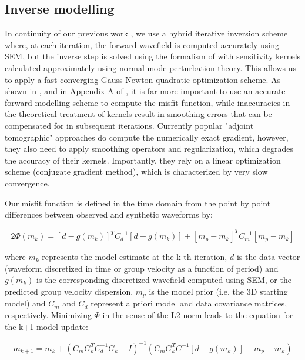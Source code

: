 \documentclass[12pt]{article}
\begin{document}
\subsection{Inverse modelling}

In continuity of our previous work \citep[e.g][]{marone2007three,yuan20113,yuan2014multiscale}, we use a hybrid iterative inversion scheme where, at each iteration, the forward wavefield is computed accurately using SEM, but the inverse step is solved using the formalism of \cite{tarantola1982generalized}  with sensitivity kernels calculated approximately using normal mode perturbation theory. This allows us to apply a fast converging Gauss-Newton quadratic optimization scheme. 
As shown in \cite{tarantola2005inverse}, and in Appendix A of \cite{lekic2011inferring}, it is far more important to use an accurate forward modelling scheme to compute the misfit function, while inaccuracies in the theoretical treatment of kernels result in smoothing errors that can be compensated for in subsequent iterations. Currently popular "adjoint tomographic" approaches \citep{zhu2015seismic,bozdag2016global} do compute the numerically exact gradient, however, they also need to apply smoothing operators and regularization, which degrades the accuracy of their kernels. Importantly, they rely on a linear optimization scheme (conjugate gradient method), which is characterized by very slow convergence.

Our misfit function is defined in the time domain from the point by point differences between observed and synthetic waveforms by:

\begin{equation}
2\Phi(m_{k}) = [d - g(m_{k})]^{T} C^{-1}_{d} [d-g(m_{k})] + [m_{p}-m_{k}]^{T} C_{m}^{-1} [m_{p}-m_{k}]
\end{equation}

where $m_{k}$ represents the model estimate at the k-th iteration, $d$ is the data vector (waveform discretized in time or group velocity as a function of period) and $g(m_k)$ is the corresponding discretized wavefield computed using SEM, or the predicted group velocity dispersion. $m_p$ is the model prior (i.e. the 3D starting model) and $C_m$ and $C_d$ represent a priori model and data covariance matrices, respectively. Minimizing $\Phi$ in the sense of the L2 norm leads to the equation for the k+1 model update:

\begin{equation}
m_{k+1} = m_{k} + (C_{m}G^{T}_{k}C^{-1}_{d}G_{k} + I)^{-1} (C_{m}G_{k}^{T}C^{-1}[d-g(m_{k})]+ m_{p}-m_{k})
\end{equation}
\end{document}
